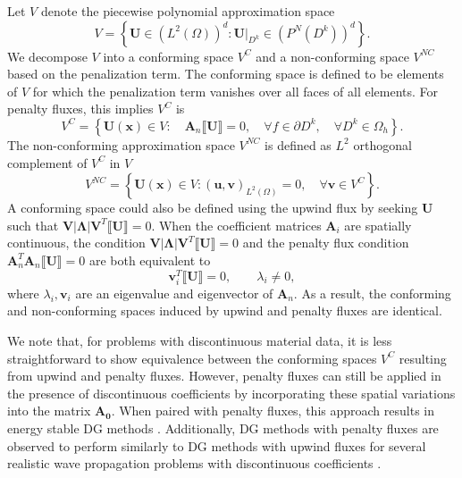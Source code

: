 \documentclass[preprint,10pt]{elsarticle}
\newcommand{\LRp}[1]{\left( #1 \right)}
\newcommand{\LRb}[1]{\left| #1 \right|}
\newcommand{\LRc}[1]{\left\{ #1 \right\}}
\newcommand{\jump}[1] {\ensuremath{\llbracket#1\rrbracket}}
\newcommand{\Oh}{\Omega_h}
\begin{document}
Let $V$ denote the piecewise polynomial approximation space 
\[
V = \LRc{ \bm{U} \in\LRp{ L^2(\Omega)}^d : \left.\bm{U}\right|_{D^k} \in \LRp{P^N(D^k)}^d}.  
\]
We decompose $V$ into a conforming space $V^C$ and a non-conforming space $V^{NC}$ based on the penalization term.  The conforming space is defined to be elements of $V$ for which the penalization term vanishes over all faces of all elements.  For penalty fluxes, this implies $V^C$ is 
\begin{equation}
V^{C} = \LRc{ \bm{U}(\bm{x}) \in V: \quad  \bm{A}_n\jump{\bm{U}} = 0, \quad \forall f \in \partial D^k, \quad \forall D^k\in \Oh}.
\label{eq:conf}
\end{equation}
The non-conforming approximation space $V^{NC}$ is defined as $L^2$ orthogonal complement of $V^{C}$ in $V$
\[
V^{NC} = \LRc{ \bm{U}(\bm{x}) \in V: \LRp{\bm{u},\bm{v}}_{L^2(\Omega)} = 0, \quad \forall \bm{v}\in V^C}.
\]
A conforming space could also be defined using the upwind flux by seeking $\bm{U}$ such that $\bm{V}\LRb{\bm{\Lambda}}\bm{V}^T \jump{\bm{U}} = 0$.  When the coefficient matrices $\bm{A}_i$ are spatially continuous, the condition $\bm{V}\LRb{\bm{\Lambda}}\bm{V}^T \jump{\bm{U}} = 0$ and the penalty flux condition $\bm{A}_n^T \bm{A}_n\jump{\bm{U}} = 0$ are both equivalent to
\[
\bm{v}_i^T \jump{\bm{U}} = 0, \qquad \lambda_i \neq 0,
\]
where $\lambda_i, \bm{v}_i$ are an eigenvalue and eigenvector of $\bm{A}_n$.  As a result, the conforming and non-conforming spaces induced by upwind and penalty fluxes are identical.  

We note that, for problems with discontinuous material data, it is less straightforward to show equivalence between the conforming spaces $V^C$ resulting from upwind and penalty fluxes.  However, penalty fluxes can still be applied in the presence of discontinuous coefficients by incorporating these spatial variations into the matrix $\bm{A_0}$.  When paired with penalty fluxes, this approach results in energy stable DG methods \cite{chan2016weight1}.  Additionally, DG methods with penalty fluxes are observed to perform similarly to DG methods with upwind fluxes for several realistic wave propagation problems with discontinuous coefficients \cite{ye2016discontinuous}.  
\end{document}
